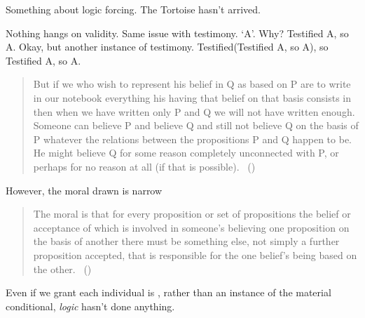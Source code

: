 \begin{note}
  \color{red}
  Something about logic forcing.
  The Tortoise hasn't arrived.

  Nothing hangs on validity.
  Same issue with testimony.
  `A'.
  Why?
  Testified A, so A.
  Okay, but another instance of testimony.
  Testified(Testified A, so A), so Testified A, so A.
\end{note}

\begin{note}
  \begin{quote}
    But if we who wish to represent his belief in Q as based on P are to write in our notebook everything his having that belief on that basis consists in then when we have written only P and Q we will not have written enough.
    Someone can believe P and believe Q and still not believe Q on the basis of P whatever the relations between the propositions P and Q happen to be.
    He might believe Q for some reason completely unconnected with P, or perhaps for no reason at all (if that is possible).%
    \mbox{ }\hfill\mbox{(\citeyear[185]{Stroud:1979aa})}
  \end{quote}
  However, the moral drawn is narrow
  \begin{quote}
    The moral is that for every proposition or set of propositions the belief or acceptance of which is involved in someone's believing one proposition on the basis of another there must be something else, not simply a further proposition accepted, that is responsible for the one belief's being based on the other.%
    \mbox{ }\hfill\mbox{(\citeyear[187]{Stroud:1979aa})}
  \end{quote}

  Even if we grant each individual is \ros{}, rather than an instance of the material conditional, \emph{logic} hasn't done anything.
\end{note}


